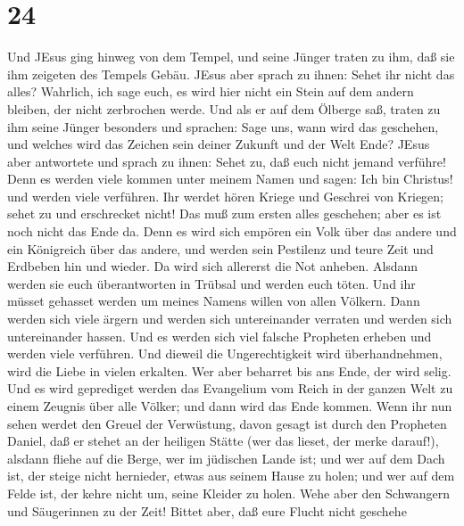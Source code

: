 \hypertarget{section-23}{%
\section{24}\label{section-23}}

 Und JEsus ging hinweg von dem Tempel, und seine Jünger
traten zu ihm, daß sie ihm zeigeten des Tempels Gebäu. 
JEsus aber sprach zu ihnen: Sehet ihr nicht das alles? Wahrlich, ich
sage euch, es wird hier nicht ein Stein auf dem andern bleiben, der
nicht zerbrochen werde.  Und als er auf dem Ölberge saß,
traten zu ihm seine Jünger besonders und sprachen: Sage uns, wann wird
das geschehen, und welches wird das Zeichen sein deiner Zukunft und der
Welt Ende?  JEsus aber antwortete und sprach zu ihnen: Sehet
zu, daß euch nicht jemand verführe!  Denn es werden viele
kommen unter meinem Namen und sagen: Ich bin Christus! und werden viele
verführen.  Ihr werdet hören Kriege und Geschrei von
Kriegen; sehet zu und erschrecket nicht! Das muß zum ersten alles
geschehen; aber es ist noch nicht das Ende da.  Denn es wird
sich empören ein Volk über das andere und ein Königreich über das
andere, und werden sein Pestilenz und teure Zeit und Erdbeben hin und
wieder.  Da wird sich allererst die Not anheben.
 Alsdann werden sie euch überantworten in Trübsal und werden
euch töten. Und ihr müsset gehasset werden um meines Namens willen von
allen Völkern.  Dann werden sich viele ärgern und werden
sich untereinander verraten und werden sich untereinander hassen.
 Und es werden sich viel falsche Propheten erheben und
werden viele verführen.  Und dieweil die Ungerechtigkeit
wird überhandnehmen, wird die Liebe in vielen erkalten. 
Wer aber beharret bis ans Ende, der wird selig.  Und es
wird geprediget werden das Evangelium vom Reich in der ganzen Welt zu
einem Zeugnis über alle Völker; und dann wird das Ende kommen.
 Wenn ihr nun sehen werdet den Greuel der Verwüstung, davon
gesagt ist durch den Propheten Daniel, daß er stehet an der heiligen
Stätte (wer das lieset, der merke darauf!),  alsdann fliehe
auf die Berge, wer im jüdischen Lande ist;  und wer auf dem
Dach ist, der steige nicht hernieder, etwas aus seinem Hause zu holen;
 und wer auf dem Felde ist, der kehre nicht um, seine
Kleider zu holen.  Wehe aber den Schwangern und Säugerinnen
zu der Zeit!  Bittet aber, daß eure Flucht nicht geschehe
